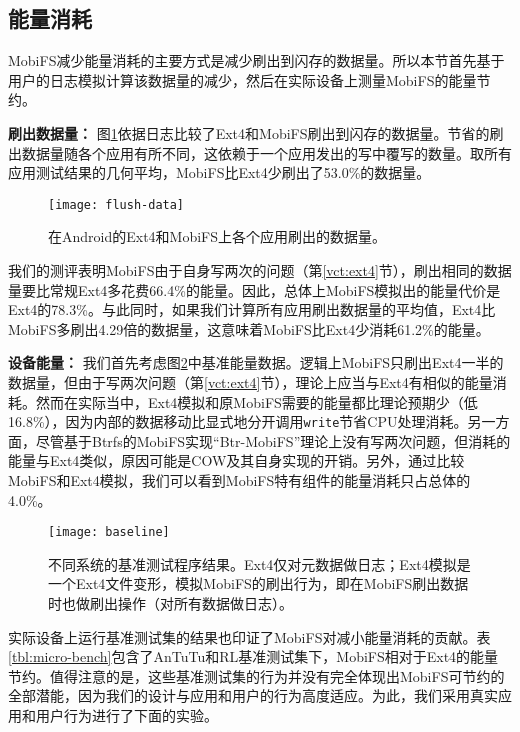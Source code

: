 \subsection{能量消耗} \label{vct:eval-energy}

MobiFS减少能量消耗的主要方式是减少刷出到闪存的数据量。所以本节首先基于用户的日志模拟计算该数据量的减少，然后在实际设备上测量MobiFS的能量节约。

\noindent\textbf{刷出数据量：}
图\ref{fig:flush-data}依据日志比较了Ext4和MobiFS刷出到闪存的数据量。节省的刷出数据量随各个应用有所不同，这依赖于一个应用发出的写中覆写的数量。取所有应用测试结果的几何平均，MobiFS比Ext4少刷出了53.0\%的数据量。

\begin{figure}[!ht]
  \centering
  \texttt{[image: flush-data]}
  \caption{在Android的Ext4和MobiFS上各个应用刷出的数据量。}
  \label{fig:flush-data}
\end{figure}

我们的测评表明MobiFS由于自身写两次的问题（第\ref{vct:ext4}节），刷出相同的数据量要比常规Ext4多花费66.4\%的能量。因此，总体上MobiFS模拟出的能量代价是Ext4的78.3\%。与此同时，如果我们计算所有应用刷出数据量的平均值，Ext4比MobiFS多刷出4.29倍的数据量，这意味着MobiFS比Ext4少消耗61.2\%的能量。

\noindent\textbf{设备能量：}
我们首先考虑图\ref{fig:baseline}中基准能量数据。逻辑上MobiFS只刷出Ext4一半的数据量，但由于写两次问题（第\ref{vct:ext4}节），理论上应当与Ext4有相似的能量消耗。然而在实际当中，Ext4模拟和原MobiFS需要的能量都比理论预期少（低16.8\%），因为内部的数据移动比显式地分开调用\texttt{write}节省CPU处理消耗。另一方面，尽管基于Btrfs的MobiFS实现“Btr-MobiFS”理论上没有写两次问题，但消耗的能量与Ext4类似，原因可能是COW及其自身实现的开销。另外，通过比较MobiFS和Ext4模拟，我们可以看到MobiFS特有组件的能量消耗只占总体的4.0\%。

\begin{figure}[!ht]
  \centering
  \texttt{[image: baseline]}
  \caption{不同系统的基准测试程序结果。Ext4仅对元数据做日志；Ext4模拟是一个Ext4文件变形，模拟MobiFS的刷出行为，即在MobiFS刷出数据时也做刷出操作（对所有数据做日志）。}
  \label{fig:baseline}
\end{figure}

实际设备上运行基准测试集的结果也印证了MobiFS对减小能量消耗的贡献。表\ref{tbl:micro-bench}包含了AnTuTu和RL基准测试集下，MobiFS相对于Ext4的能量节约。值得注意的是，这些基准测试集的行为并没有完全体现出MobiFS可节约的全部潜能，因为我们的设计与应用和用户的行为高度适应。为此，我们采用真实应用和用户行为进行了下面的实验。

